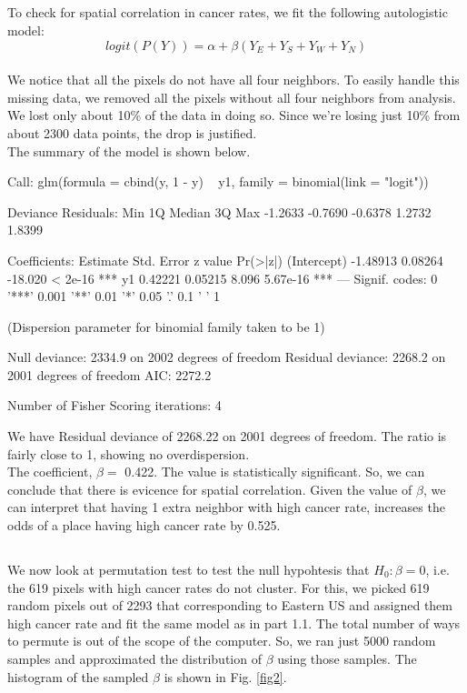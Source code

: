 \documentclass{article}
\begin{document}
\subsection{}
To check for spatial correlation in cancer rates, we fit the following autologistic model:
$$logit(P(Y))=\alpha +\beta(Y_E+Y_S+Y_W+Y_N)$$\\
We notice that all the pixels do not have all four neighbors. To easily handle this missing data, we removed all the pixels without all four neighbors from analysis. We lost only about 10\% of the data in doing so. Since we're losing just 10\% from about 2300 data points, the drop is justified.\\
The summary of the model is shown below.\\
\begin{Schunk}
\begin{Soutput}
Call:
glm(formula = cbind(y, 1 - y) ~ y1, family = binomial(link = "logit"))

Deviance Residuals: 
    Min       1Q   Median       3Q      Max  
-1.2633  -0.7690  -0.6378   1.2732   1.8399  

Coefficients:
            Estimate Std. Error z value Pr(>|z|)    
(Intercept) -1.48913    0.08264 -18.020  < 2e-16 ***
y1           0.42221    0.05215   8.096 5.67e-16 ***
---
Signif. codes:  0 '***' 0.001 '**' 0.01 '*' 0.05 '.' 0.1 ' ' 1

(Dispersion parameter for binomial family taken to be 1)

    Null deviance: 2334.9  on 2002  degrees of freedom
Residual deviance: 2268.2  on 2001  degrees of freedom
AIC: 2272.2

Number of Fisher Scoring iterations: 4
\end{Soutput}
\end{Schunk}
We have Residual deviance of 2268.22 on 2001 degrees of freedom. The ratio is fairly close to 1, showing no overdispersion.\\
The coefficient, $\beta=$ 0.422. The value is statistically significant. So, we can conclude that there is evicence for spatial correlation. Given the value of $\beta$, we can interpret that having 1 extra neighbor with high cancer rate, increases the odds of a place having high cancer rate by 0.525.\\

\subsection{}
We now look at permutation test to test the null hypohtesis that $H_0:\beta=0$, i.e. the 619 pixels with high cancer rates do not cluster. For this, we picked 619 random pixels out of 2293 that corresponding to Eastern US and assigned them high cancer rate and fit the same model as in part 1.1. The total number of ways to permute is out of the scope of the computer. So, we ran just 5000 random samples and approximated the distribution of $\beta$ using those samples. The histogram of the sampled $\beta$ is shown in Fig. \ref{fig2}.\\
\end{document}
